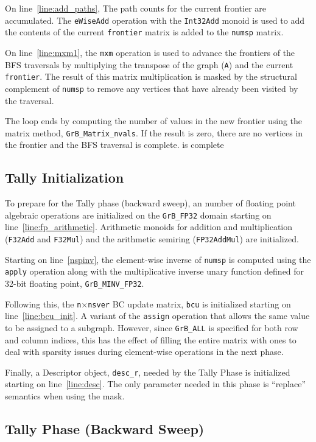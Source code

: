 On line~\ref{line:add_paths}, The path counts for the current frontier are 
accumulated.  The {\tt eWiseAdd} operation with the 
{\tt Int32Add} monoid is used to add the contents of the current {\tt frontier} matrix is
added to the {\tt numsp} matrix.

On line~\ref{line:mxm1}, the {\tt mxm} operation is used to advance the frontiers
of the BFS traversals by multiplying the transpose of the graph ({\tt A}) and the 
current {\tt frontier}. The result of this matrix multiplication is masked by the
structural complement of {\tt numsp} to remove any vertices that have already
been visited by the traversal.

The loop ends by computing the number of values in the new frontier using the
matrix method, {\tt GrB\_Matrix\_nvals}.  If the result is zero, there are no
vertices in the frontier and the BFS traversal is complete.
is complete

\subsection{Tally Initialization}

To prepare for the Tally phase (backward sweep), an number of floating point 
algebraic operations are initialized on the {\tt GrB\_FP32} domain starting on 
line~\ref{line:fp_arithmetic}.  Arithmetic monoids for addition and multiplication
({\tt F32Add} and {\tt F32Mul}) and the arithmetic semiring ({\tt FP32AddMul}) 
are initialized.

Starting on line~\ref{nspinv}, the element-wise inverse of {\tt numsp} is 
computed using the {\tt apply} operation along with the multiplicative inverse
unary function defined for 32-bit floating point, {\tt GrB\_MINV\_FP32}.

Following this, the {\tt n}$\times${\tt nsver} BC update matrix, {\tt bcu} is 
initialized starting on line~\ref{line:bcu_init}.  A variant of the {\tt assign} 
operation that allows the same value to be assigned to a subgraph.  However, 
since {\tt GrB\_ALL} is specified
for both row and column indices, this has the effect of filling the entire
matrix with ones to deal with sparsity issues during element-wise operations in
the next phase.

Finally, a Descriptor object, {\tt desc\_r}, needed by the Tally Phase is 
initialized starting on line~\ref{line:desc}.  The only parameter needed in this
phase is ``replace'' semantics when using the mask. 

\subsection{Tally Phase (Backward Sweep)}


